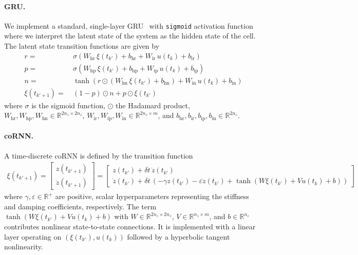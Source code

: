\paragraph{GRU.}
We implement a standard, single-layer GRU~\cite{cho2014learning} with \texttt{sigmoid} activation function where we interpret the latent state of the system as the hidden state of the cell. The latent state transition functions are given by
\begin{equation}
\begin{split}
    r =& \: \sigma \left ( W_\mathrm{hr} \, \xi(t_{k'}) + b_\mathrm{hr} + W_\mathrm{ir} \, u(t_{k}) + b_\mathrm{ir} \right )\\
    p =& \: \sigma \left ( W_\mathrm{hp} \, \xi(t_{k'}) + b_\mathrm{hp} + W_\mathrm{ip} \, u(t_{k}) + b_\mathrm{ip} \right )\\
    n =& \: \tanh \left ( r \odot \left ( W_\mathrm{hn} \, \xi(t_{k'}) + b_\mathrm{hn} \right) + W_\mathrm{in} \, u(t_{k}) + b_\mathrm{in} \right )\\
    \xi(t_{k'+1}) =& \: (1-p) \odot n + p \odot \xi(t_{k'})
\end{split}
\end{equation}
where $\sigma$ is the sigmoid function, $\odot$ the Hadamard product, $W_\mathrm{hr}, W_\mathrm{hp}, W_\mathrm{hn} \in \mathbb{R}^{2 n_z \times 2 n_z}$, $W_\mathrm{ir}, W_\mathrm{ip}, W_\mathrm{in} \in \mathbb{R}^{2 n_z \times m}$, and $b_\mathrm{hr}, b_\mathrm{ir}, b_\mathrm{ip}, b_\mathrm{in} \in \mathbb{R}^{2 n_z}$.

\paragraph{coRNN.} A time-discrete \gls{coRNN} is defined by the transition function
\begin{equation}
\begin{split}
    \xi(t_{k'+1}) = \begin{bmatrix}
        z(t_{k'+1})\\
        \dot{z}(t_{k'+1})
    \end{bmatrix} = \begin{bmatrix}
        z(t_{k'}) + \delta t \, \dot{z}(t_{k'})\\
        \dot{z}(t_{k'}) + \delta t \, \left ( - \gamma z(t_{k'}) - \varepsilon \dot{z}(t_{k'}) + \tanh \left ( W \xi(t_{k'}) + V u(t_k) + b \right ) \right )
    \end{bmatrix}
\end{split}
\end{equation}
where $\gamma, \varepsilon \in \mathbb{R}^+$ are positive, scalar hyperparameters representing the stiffness and damping coefficients, respectively. The term $\tanh \left ( W \xi(t_{k'}) + V u(t_k) + b \right )$ with $W \in \mathbb{R}^{2n_z \times 2n_z}$, $V \in \mathbb{R}^{n_z \times m}$, and $b \in \mathbb{R}^{n_z}$ contributes nonlinear state-to-state connections. It is implemented with a linear layer operating on $(\xi(t_{k'}), u(t_k))$ followed by a hyperbolic tangent nonlinearity.


